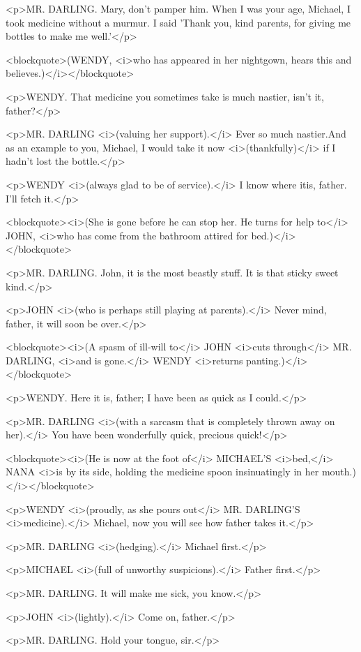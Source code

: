 <p>MR. DARLING. Mary, don't pamper him. When I was your age, Michael,
I took medicine without a murmur. I said 'Thank you, kind parents,
for giving me bottles to make me well.'</p>

<blockquote>(WENDY, <i>who has appeared in her nightgown, hears this
and believes.)</i></blockquote>

<p>WENDY. That medicine you sometimes take is much nastier, isn't it,
father?</p>

<p>MR. DARLING <i>(valuing her support).</i> Ever so much nastier.And
as an example to you, Michael, I would take it now
<i>(thankfully)</i> if I hadn't lost the bottle.</p>

<p>WENDY <i>(always glad to be of service).</i> I know where itis,
father. I'll fetch it.</p>

<blockquote><i>(She is gone before he can stop her. He turns for help
to</i> JOHN, <i>who has come from the bathroom attired for
bed.)</i></blockquote>

<p>MR. DARLING. John, it is the most beastly stuff. It is that sticky
sweet kind.</p>

<p>JOHN <i>(who is perhaps still playing at parents).</i> Never mind,
father, it will soon be over.</p>

<blockquote><i>(A spasm of ill-will to</i> JOHN <i>cuts through</i>
MR. DARLING, <i>and is gone.</i> WENDY <i>returns
panting.)</i></blockquote>

<p>WENDY. Here it is, father; I have been as quick as I could.</p>

<p>MR. DARLING <i>(with a sarcasm that is completely thrown away on
her).</i> You have been wonderfully quick, precious quick!</p>

<blockquote><i>(He is now at the foot of</i> MICHAEL'S <i>bed,</i>
NANA <i>is by its side, holding the medicine spoon insinuatingly in
her mouth.)</i></blockquote>

<p>WENDY <i>(proudly, as she pours out</i> MR. DARLING'S
<i>medicine).</i> Michael, now you will see how father takes it.</p>

<p>MR. DARLING <i>(hedging).</i> Michael first.</p>

<p>MICHAEL <i>(full of unworthy suspicions).</i> Father first.</p>

<p>MR. DARLING. It will make me sick, you know.</p>

<p>JOHN <i>(lightly).</i> Come on, father.</p>

<p>MR. DARLING. Hold your tongue, sir.</p>

